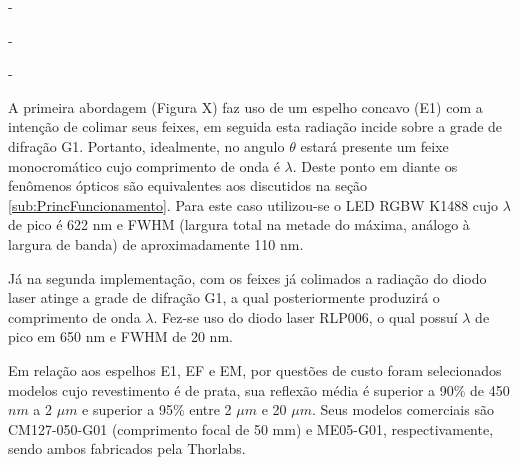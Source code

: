 \documentclass[oneside,openright,12pt]{ufsm_2021} %
\begin{document}
        \par                                  -
        \par [Diagrama esquemático Sistema LED RGB]
        \par                                  -
        \par [Diagrama esquemático Sistema Diodo Laser]
        \par                                  -

        \par A primeira abordagem (Figura X) faz uso de um espelho concavo (E1) com a intenção de colimar seus feixes, em seguida esta radiação incide sobre a grade de difração G1. Portanto, idealmente, no angulo $\theta$ estará presente um feixe monocromático cujo comprimento de onda é $\lambda$. Deste ponto em diante os fenômenos ópticos são equivalentes aos discutidos na seção \ref{sub:PrincFuncionamento}. Para este caso utilizou-se o LED RGBW K1488 cujo $\lambda$ de pico é 622 nm e FWHM (largura total na metade do máxima, análogo à largura de banda) de aproximadamente 110 nm.
        \par Já na segunda implementação, com os feixes já colimados a radiação do diodo laser atinge a grade de difração G1, a qual posteriormente produzirá 
        o comprimento de onda $\lambda$. Fez-se uso do diodo laser RLP006, o qual possuí $\lambda$ de pico em 650 nm e FWHM de 20 nm.

        \par Em relação aos espelhos E1, EF e EM, por questões de custo foram selecionados modelos cujo revestimento é de prata, sua reflexão média é superior a 90\% de 450 $nm$ a 2 $\mu m$ e superior a 95\% entre 2 $\mu m$ e 20 $\mu m$. Seus modelos comerciais são CM127-050-G01 (comprimento focal de 50 mm) e ME05-G01, respectivamente, sendo ambos fabricados pela Thorlabs. 
        
\end{document}

